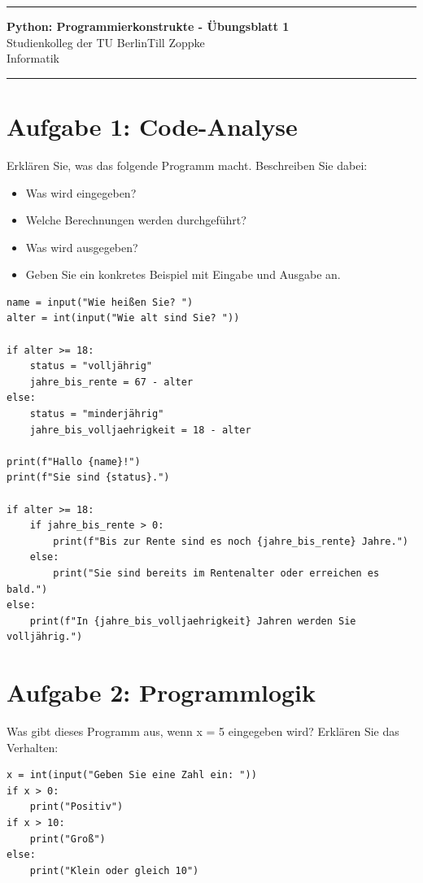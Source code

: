 \documentclass[ngerman,11pt]{article}
\date{\DTMgermanmonthname{\month} \the\year}
\begin{document}
\hrule
\begin{center}
{\large\bf Python: Programmierkonstrukte - Übungsblatt 1}\\[-0mm]
Studienkolleg der TU Berlin\hfill Till Zoppke\\
Informatik \hfill \DTMgermanmonthname{\month} \the\year\\[2mm]
\end{center}
\hrule
\par\bigskip

\section*{Aufgabe 1: Code-Analyse}

Erklären Sie, was das folgende Programm macht. Beschreiben Sie dabei:
\begin{itemize}[leftmargin=*]
\item Was wird eingegeben?
\item Welche Berechnungen werden durchgeführt?
\item Was wird ausgegeben?
\item Geben Sie ein konkretes Beispiel mit Eingabe und Ausgabe an.
\end{itemize}

\begin{lstlisting}
name = input("Wie heißen Sie? ")
alter = int(input("Wie alt sind Sie? "))

if alter >= 18:
    status = "volljährig"
    jahre_bis_rente = 67 - alter
else:
    status = "minderjährig"
    jahre_bis_volljaehrigkeit = 18 - alter

print(f"Hallo {name}!")
print(f"Sie sind {status}.")

if alter >= 18:
    if jahre_bis_rente > 0:
        print(f"Bis zur Rente sind es noch {jahre_bis_rente} Jahre.")
    else:
        print("Sie sind bereits im Rentenalter oder erreichen es bald.")
else:
    print(f"In {jahre_bis_volljaehrigkeit} Jahren werden Sie volljährig.")
\end{lstlisting}

\section*{Aufgabe 2: Programmlogik}
Was gibt dieses Programm aus, wenn x = 5 eingegeben wird? Erklären Sie das Verhalten:

\begin{lstlisting}
x = int(input("Geben Sie eine Zahl ein: "))
if x > 0:
    print("Positiv")
if x > 10:
    print("Groß")
else:
    print("Klein oder gleich 10")
\end{lstlisting}
\end{document}
